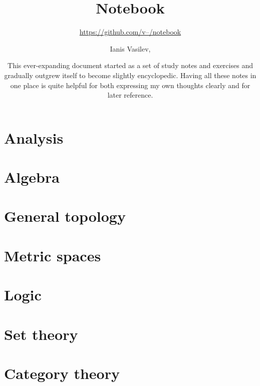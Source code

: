 \documentclass[numbers=endperiod, bibliography=totocnumbered, oneside]{scrbook}
\title{Notebook}
\subtitle{\href{https://github.com/v--/notebook}{https://github.com/v--/notebook}}
\author{Ianis Vasilev, \Email{ianis@ivasilev.net}}
\date{\justify
  This ever-expanding document started as a set of study notes and exercises and gradually outgrew itself to become slightly encyclopedic. Having all these notes in one place is quite helpful for both expressing my own thoughts clearly and for later reference.
}
\begin{document}
\hfuzz=2pt
\maketitle
\tableofcontents

\chapter{Analysis}\label{ch:analysis}










\chapter{Algebra}\label{ch:algebra}






\chapter{General topology}\label{ch:general_topology}







\chapter{Metric spaces}\label{ch:metric_spaces}




\chapter{Logic}\label{ch:logic}




\chapter{Set theory}\label{ch:set_theory}




\chapter{Category theory}\label{ch:category_theory}




\end{document}
